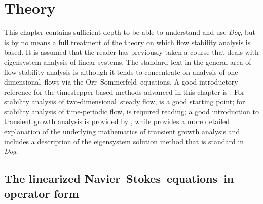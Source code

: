 \documentclass[11pt,a4paper]{report}
\newcommand\NavSto{Navier--Stokes}
\newcommand\LNS{linearized \NavSto}
\newcommand\LNSE{\LNS\ equations}
\newcommand\Orrsom{Orr--Sommerfeld}
\newcommand\oned{one-di\-men\-sion\-al}
\newcommand\twod{two-di\-men\-sion\-al}
\newcommand{\Dog}{\emph{Dog}}
\begin{document}
\chapter{Theory}
\label{ch.theory}

This chapter contains sufficient depth to be able to understand and
use \Dog, but is by no means a full treatment of the theory on which
flow stability analysis is based.  It is assumed that the reader has
previously taken a course that deals with eigensystem analysis of
linear systems.
%
The standard text in the general area of flow stability analysis is
\citet{schmid01} although it tends to concentrate on analysis of
\oned\ flows via the \Orrsom\ equations.
%
A good introductory reference for the timestepper-based methods
advanced in this chapter is \citet{tuba00}.
%
For stability analysis of \twod\ steady flow, \citet{bgh02} is a good
starting point; for stability analysis of time-periodic flow,
\cite{bah96} is required reading; a good introduction to transient
growth analysis is provided by \citet{bbs08a}, while \citet{bbs08b}
provides a more detailed explanation of the underlying mathematics of
transient growth analysis and includes a description of the
eigensystem solution method that is standard in \Dog.

\section{The \LNSE\ in operator form}
\end{document}
